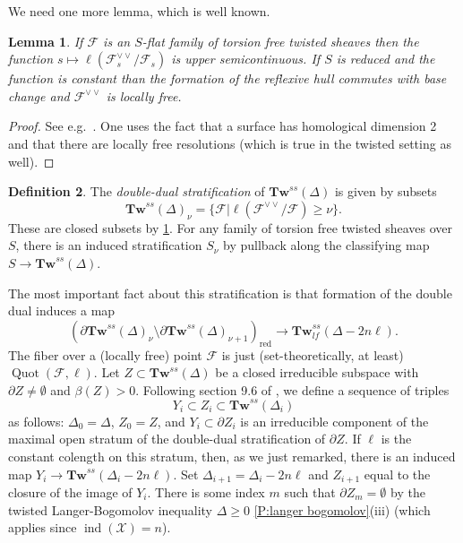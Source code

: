 \documentclass[11pt]{amsart}
\newcommand{\ms}[1]{\mathscr #1}
\newcommand{\shom}{\ms H\!om}
\DeclareMathOperator{\quot}{Quot}
\DeclareMathOperator{\ind}{ind}
\renewcommand{\[}{[\!\hspace{0.03em}[}
\renewcommand{\]}{]\!\hspace{0.03em}]}
\renewcommand{\(}{(\!\hspace{0.03em}(}
\renewcommand{\)}{)\!\hspace{0.03em})}
\newcommand{\inj}{\hookrightarrow}
\newcommand{\Tw}{\mathbf{Tw}}
\newtheorem{lem}{Lemma}[subsubsection]%
\theoremstyle{definition}
\newtheorem{defn}[lem]{Definition}
\theoremstyle{remark}
\begin{document}
We need one more lemma, which is well known.  

\begin{lem}\label{L:double dual} If $\ms F$ is an $S$-flat family of torsion free twisted 
sheaves then the function $s\mapsto\ell(\ms F_{s}^{\vee\vee}/\ms 
F_{s})$ is upper semicontinuous.  If $S$ is reduced and the function 
is constant than the formation of the reflexive hull commutes with 
base change and $\ms F^{\vee\vee}$ is locally free.
\end{lem}
\begin{proof} See e.g.\ \cite[9.6.1]{h-l}.  One uses the fact that a surface has homological 
dimension 2 and that there are locally free resolutions (which is true 
in the twisted setting as well).
\end{proof}

\begin{defn} The \emph{double-dual stratification\/} of 
$\Tw^{ss}(\Delta)$ is given by subsets $$\Tw^{ss}(\Delta)_{\nu}=\{\ms 
F|\ell(\ms F^{\vee\vee}/\ms F)\geq\nu\}.$$
These are closed subsets by \ref{L:double dual}.  For any family of 
torsion free twisted sheaves over $S$, there is an induced 
stratification $S_{\nu}$ by pullback along the classifying map 
$S\to\Tw^{ss}(\Delta)$.
\end{defn}

The most important fact about this stratification is that formation 
of the double dual induces a map 
$$(\partial\Tw^{ss}(\Delta)_{\nu}\setminus\partial\Tw^{ss}(\Delta)_{\nu+1})_{\text{red}}\to\Tw^{ss}_{lf}(\Delta-2n\ell).$$
The fiber over a (locally free) point $\ms F$ is just 
(set-theoretically, at least) $\quot(\ms F,\ell)$.   Let 
$Z\subset\Tw^{ss}(\Delta)$ be a closed irreducible subspace with 
$\partial Z\neq\emptyset$ and $\beta(Z)>0$.  Following section 9.6 of \cite{h-l}, we define a sequence of triples
$$Y_{i}\subset Z_{i}\subset\Tw^{ss}(\Delta_{i})$$
as follows: $\Delta_{0}=\Delta$, $Z_{0}=Z$, and $Y_{i}\subset\partial 
Z_{i}$ is an irreducible component of the maximal open stratum of the 
double-dual stratification of $\partial Z$.  If $\ell$ is the 
constant colength on this stratum, then, as we just remarked, there is 
an induced map $Y_{i}\to\Tw^{ss}(\Delta_{i}-2n\ell)$.  Set 
$\Delta_{i+1}=\Delta_{i}-2n\ell$ and $Z_{i+1}$ equal to the closure of 
the image of $Y_{i}$.  There is some index $m$ such that $\partial 
Z_{m}=\emptyset$ by the twisted Langer-Bogomolov inequality 
$\Delta\geq 0$ \ref{P:langer bogomolov}(iii) (which applies since 
$\ind(\ms X)=n$).
\end{document}

